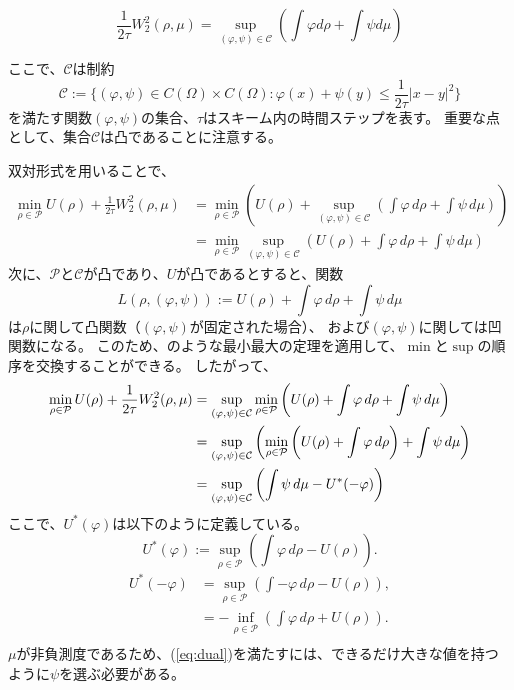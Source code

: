 \begin{equation}
    \label{eq:wasserstein dual}
    \frac{1}{2\tau} W_2^2(\rho, \mu) = \sup_{(\varphi, \psi) \in \mathcal{C}} \left( \int \varphi d\rho + \int \psi d\mu \right)
\end{equation}

ここで、$\mathcal{C}$は制約
\[
    \mathcal{C}  := \{(\varphi, \psi) \in C(\Omega) \times C(\Omega) : \varphi(x) + \psi(y) \leq \frac{1}{2 \tau} |x - y|^2 \}
\]
を満たす関数$(\varphi, \psi)$の集合、$\tau$はスキーム内の時間ステップを表す。
重要な点として、集合$\mathcal{C}$は凸であることに注意する。

双対形式を用いることで、
\begin{align*}
    \min_{\rho \in \mathcal{P}} U(\rho) + \frac{1}{2\tau} W_2^2(\rho, \mu) &= \min_{\rho \in \mathcal{P}} \left(U(\rho) + \sup_{(\varphi, \psi) \in \mathcal{C}} \left(\int \varphi \, d\rho + \int \psi \, d\mu\right)\right)\\
                                                                            &= \min_{\rho \in \mathcal{P}} \sup_{(\varphi, \psi) \in \mathcal{C}} \left(U(\rho) + \int \varphi \, d\rho + \int \psi \, d\mu\right)
  \end{align*}
  次に、\(\mathcal{P}\)と\(\mathcal{C}\)が凸であり、\(U\)が凸であるとすると、関数
  \[
    \label{eq:L}
    L(\rho, (\varphi, \psi)) := U(\rho) + \int \varphi \, d\rho + \int \psi \, d\mu
  \]
  は\hypertarget{rho_convex}{\(\rho\)に関して凸関数}（\((\varphi, \psi)\)が固定された場合）、
  および\hypertarget{varphipsi_concave}{\((\varphi, \psi)\)に関しては凹関数}になる。
  このため、\cite[Proposition 2.4 (p176)]{MR1727362}のような最小最大の定理を適用して、\(\min\)と\(\sup\)の順序を交換することができる。
  したがって、
  \begin{align}
    \label{eq:dual}
    \min_{\rho \in \mathcal{P}} U(\rho) + \frac{1}{2\tau} W_2^2(\rho, \mu) &= \sup_{(\varphi, \psi) \in \mathcal{C}} \min_{\rho \in \mathcal{P}} \left(U(\rho) + \int \varphi \, d\rho + \int \psi \, d\mu \right)  \notag\\
                                                                            &= \sup_{(\varphi, \psi) \in \mathcal{C}} \left(\min_{\rho \in \mathcal{P}} \left(U(\rho) + \int \varphi \, d\rho\right) + \int \psi \, d\mu\right)  \notag\\
                                                                            &= \sup_{(\varphi, \psi) \in \mathcal{C}} \left(\int \psi \, d\mu - U^*(- \varphi)\right)
  \end{align}
  ここで、$U^*(\varphi)$は以下のように定義している。 
  \[
    U^*(\varphi) := \sup_{\rho \in \mathcal{P}} \left(\int \varphi \, d\rho - U(\rho) \right).
  \]
  \begin{align*}
    U^*(- \varphi) &= \sup_{\rho \in \mathcal{P}} \left(\int - \varphi \, d\rho - U(\rho) \right),\\
                   &= - \inf_{\rho \in \mathcal{P}} \left(\int \varphi \, d\rho + U(\rho) \right) .\\
  \end{align*}
$\mu$が非負測度であるため、(\ref{eq:dual})を満たすには、できるだけ大きな値を持つように$\psi$を選ぶ必要がある。

